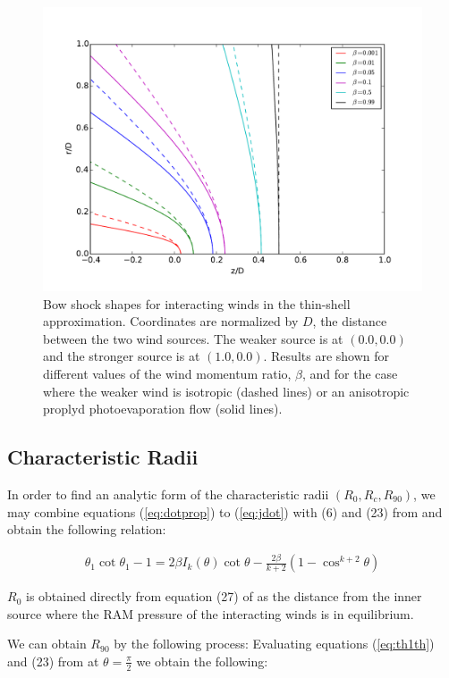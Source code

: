 \begin{figure}
\includegraphics[width=\linewidth]{r-beta}
\caption{Bow shock shapes for interacting winds in the thin-shell
  approximation. Coordinates are normalized by $D$, the distance
  between the two wind sources.  The weaker source is at \((0.0, 0.0)\)
  and the stronger source is at \((1.0, 0.0)\).  Results are shown for
  different values of the wind momentum ratio, \(\beta\), and for the
  case where the weaker wind is isotropic (dashed lines) or an
  anisotropic proplyd photoevaporation flow (solid lines).}
\label{fig:r-beta}
\end{figure}

\subsection{Characteristic Radii}

In order to find an analytic form of the characteristic radii $(R_0,R_c,R_{90})$, we may combine equations (\ref{eq:dotprop}) to (\ref{eq:jdot}) with (6) and (23) from \CRW{}
and obtain the following relation:


\begin{align}
\theta_1\cot\theta_1 -1 = 2\beta I_k(\theta) \cot\theta - \frac{2\beta}{k+2}\left(1-\cos^{k+2}\theta\right)
\label{eq:th1th}
\end{align}

$R_0$ is obtained directly from equation (27) of \CRW{} as the distance from the inner source where the RAM pressure of the interacting winds is in equilibrium.

We can obtain $R_{90}$ by the following process:
Evaluating equations  (\ref{eq:th1th}) and (23) from \CRW{} at $\theta=\frac{\pi}{2}$ we obtain the following:

